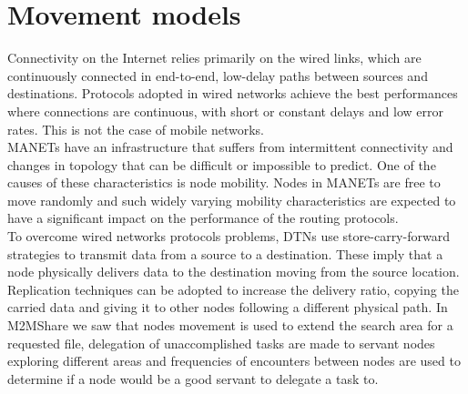 
\chapter{Movement models}\label{movimento} %






Connectivity on the Internet relies primarily on the wired links, which are continuously connected in end-to-end, low-delay paths between sources and destinations. Protocols adopted in wired networks achieve the best performances where connections are continuous, with short or constant delays and low error rates. This is not the case of mobile networks.
\\

MANETs have an infrastructure that suffers from intermittent connectivity and changes in topology that can be difficult or impossible to predict. One of the causes of these characteristics is node mobility. Nodes in MANETs are free to move randomly and such widely varying mobility characteristics are expected to have a significant impact on the performance of the routing protocols.
\\

To overcome wired networks protocols problems, DTNs use store-carry-forward strategies to transmit data from a source to a destination. These imply that a node physically delivers data to the destination moving from the source location. Replication techniques can be adopted to increase the delivery ratio, copying the carried data and giving it to other nodes following a different physical path. In M2MShare we saw that nodes movement is used to extend the search area for a requested file, delegation of unaccomplished tasks are made to servant nodes exploring different areas and frequencies of encounters between nodes are used to determine if a node would be a good servant to delegate a task to.
\\

